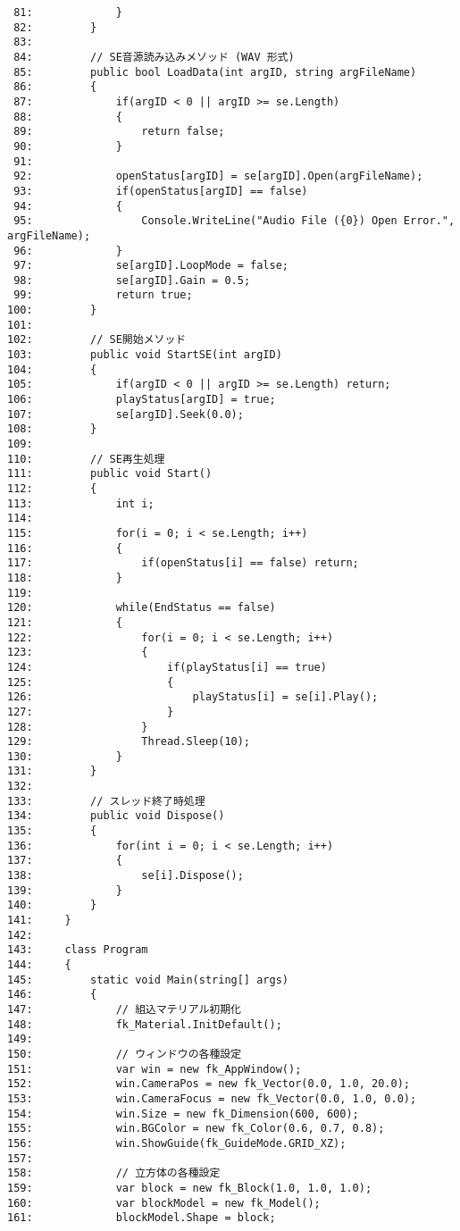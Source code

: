 \begin{breakbox}
\begin{small}
\begin{verbatim}
 81:             }
 82:         }
 83: 
 84:         // SE音源読み込みメソッド (WAV 形式)
 85:         public bool LoadData(int argID, string argFileName)
 86:         {
 87:             if(argID < 0 || argID >= se.Length)
 88:             {
 89:                 return false;
 90:             }
 91: 
 92:             openStatus[argID] = se[argID].Open(argFileName);
 93:             if(openStatus[argID] == false)
 94:             {
 95:                 Console.WriteLine("Audio File ({0}) Open Error.", argFileName);
 96:             }
 97:             se[argID].LoopMode = false;
 98:             se[argID].Gain = 0.5;
 99:             return true;
100:         }
101: 
102:         // SE開始メソッド
103:         public void StartSE(int argID)
104:         {
105:             if(argID < 0 || argID >= se.Length) return;
106:             playStatus[argID] = true;
107:             se[argID].Seek(0.0);
108:         }
109: 
110:         // SE再生処理
111:         public void Start()
112:         {
113:             int i;
114: 
115:             for(i = 0; i < se.Length; i++)
116:             {
117:                 if(openStatus[i] == false) return;
118:             }
119: 
120:             while(EndStatus == false)
121:             {
122:                 for(i = 0; i < se.Length; i++)
123:                 {
124:                     if(playStatus[i] == true)
125:                     {
126:                         playStatus[i] = se[i].Play();
127:                     }
128:                 }
129:                 Thread.Sleep(10);
130:             }
131:         }
132: 
133:         // スレッド終了時処理
134:         public void Dispose()
135:         {
136:             for(int i = 0; i < se.Length; i++)
137:             {
138:                 se[i].Dispose();
139:             }
140:         }
141:     }
142: 
143:     class Program
144:     {
145:         static void Main(string[] args)
146:         {
147:             // 組込マテリアル初期化
148:             fk_Material.InitDefault();          
149: 
150:             // ウィンドウの各種設定
151:             var win = new fk_AppWindow();
152:             win.CameraPos = new fk_Vector(0.0, 1.0, 20.0);
153:             win.CameraFocus = new fk_Vector(0.0, 1.0, 0.0);
154:             win.Size = new fk_Dimension(600, 600);
155:             win.BGColor = new fk_Color(0.6, 0.7, 0.8);
156:             win.ShowGuide(fk_GuideMode.GRID_XZ);
157: 
158:             // 立方体の各種設定
159:             var block = new fk_Block(1.0, 1.0, 1.0);
160:             var blockModel = new fk_Model();
161:             blockModel.Shape = block;

\end{verbatim}
\end{small}
\end{breakbox}
